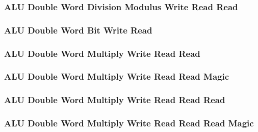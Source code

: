 \subsubsection[{\small ALU Double Word Division Modulus Write Read Read}]{ALU Double Word Division Modulus Write Read Read} \label{sec:format-ALU-DDMWRR}



\subsubsection[{\small ALU Double Word Bit Write Read}]{ALU Double Word Bit Write Read} \label{sec:format-ALU-DBWR}



\subsubsection[{\small ALU Double Word Multiply Write Read Read}]{ALU Double Word Multiply Write Read Read} \label{sec:format-ALU-DMWRR}



\subsubsection[{\small ALU Double Word Multiply Write Read Read Magic}]{ALU Double Word Multiply Write Read Read Magic} \label{sec:format-ALU-DMWRR.M}



\subsubsection[{\small ALU Double Word Multiply Write Read Read Read}]{ALU Double Word Multiply Write Read Read Read} \label{sec:format-ALU-DMWRRR}



\subsubsection[{\small ALU Double Word Multiply Write Read Read Read Magic}]{ALU Double Word Multiply Write Read Read Read Magic} \label{sec:format-ALU-DMWRRR.M}

